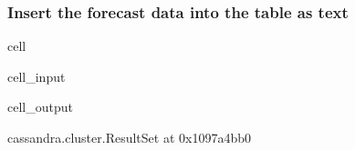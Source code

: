 \documentclass[letterpaper,10pt,english]{jupyterBook}
\begin{document}
\subsubsection{Insert the forecast data into the table as text}
\label{\detokenize{2_Data_sources/Databases/Cassandra:insert-the-forecast-data-into-the-table-as-text}}
\begin{sphinxuseclass}{cell}\begin{sphinxVerbatimInput}

\begin{sphinxuseclass}{cell_input}
\begin{sphinxVerbatim}[commandchars=\\\{\}]
 \PYG{p}{[}\PYG{p}{]}\PYG{p}{[}\PYG{p}{]} \PYG{p}{[}\PYG{p}{]}\PYG{p}{[}\PYG{p}{]}\PYG{p}{[}\PYG{p}{]} 
\end{sphinxVerbatim}

\end{sphinxuseclass}\end{sphinxVerbatimInput}
\begin{sphinxVerbatimOutput}

\begin{sphinxuseclass}{cell_output}
\begin{sphinxVerbatim}[commandchars=\\\{\}]
\PYGZlt{}cassandra.cluster.ResultSet at 0x1097a4bb0\PYGZgt{}
\end{sphinxVerbatim}

\end{sphinxuseclass}\end{sphinxVerbatimOutput}

\end{sphinxuseclass}
\end{document}
